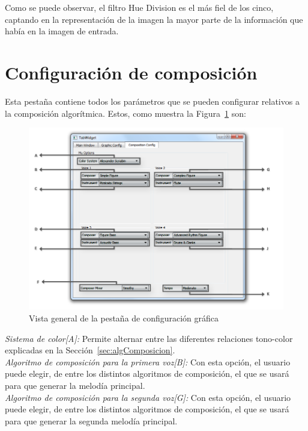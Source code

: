 		
		Como se puede observar, el filtro Hue Division es el más fiel de los cinco, captando en la representación de la imagen la mayor parte de la información que había en la imagen de entrada.		\color{black}

		
		\section{Configuración de composición}
		
		Esta pestaña contiene todos los parámetros que se pueden configurar relativos a la composición algorítmica. Estos, como muestra la Figura~\ref{fig:interfazcomp} son:\\
		
		\begin{figure}[htbp]
		\centering
		\hspace*{-0.5in}
		\includegraphics[scale=0.5]{graphics/interfazcomp.png}
		\caption{Vista general de la pestaña de configuración gráfica}
		\label{fig:interfazcomp}
		\end{figure}
		
		\noindent\textit{Sistema de color[A]:} Permite alternar entre las diferentes relaciones tono-color explicadas en la Sección~\ref{sec:algComposicion}.\\
		
		\noindent\textit{Algoritmo de composición para la primera voz[B]:} Con esta opción, el usuario puede elegir, de entre los distintos algoritmos de composición, el que se usará para que generar la melodía principal.\\
		
		\noindent\textit{Algoritmo de composición para la segunda voz[G]:} Con esta opción, el usuario puede elegir, de entre los distintos algoritmos de composición, el que se usará para que generar la segunda melodía principal.\\

